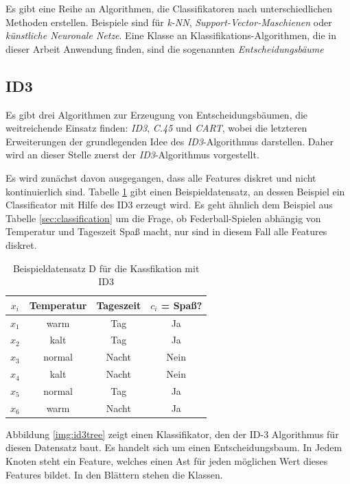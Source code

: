 Es gibt eine Reihe an Algorithmen, die Classifikatoren nach unterschiedlichen Methoden erstellen. Beispiele sind für \emph{k-NN}, \emph{Support-Vector-Maschienen} oder \emph{künstliche Neuronale Netze}. Eine Klasse an Klassifikations-Algorithmen, die in dieser Arbeit Anwendung finden, sind die sogenannten \emph{Entscheidungsbäume}

\subsection{ID3}
\label{sec:id3}

Es gibt drei Algorithmen zur Erzeugung von Entscheidungsbäumen, die weitreichende Einsatz finden: \emph{ID3}, \emph{C.45} und \emph{CART}, wobei die letzteren Erweiterungen der grundlegenden Idee des \emph{ID3}-Algorithmus darstellen. Daher wird an dieser Stelle zuerst der \emph{ID3}-Algorithmus vorgestellt. 

Es wird zunächst davon ausgegangen, dass alle Features diskret und nicht kontinuierlich sind. Tabelle \ref{tab:id3_example} gibt einen Beispieldatensatz, an dessen Beispiel ein Classificator mit Hilfe des ID3 erzeugt wird. Es geht ähnlich dem Beispiel aus Tabelle \ref{sec:classification} um die Frage, ob Federball-Spielen abhängig von Temperatur und Tageszeit Spaß macht, nur sind in diesem Fall alle Features diskret. 

\begin{table}[h]
	\centering
	\caption{Beispieldatensatz D für die Kassfikation mit ID3}
	\label{tab:id3_example}
	\begin{tabular}{cccc}
		\toprule
		$x_i$    &Temperatur   & Tageszeit & $c_i$ = Spaß? \\\midrule
		$x_1$  & warm                & Tag          & Ja           \\
		$x_2$  & kalt                & Tag          & Ja           \\
		$x_3$  & normal                & Nacht          & Nein         \\
		$x_4$  & kalt                & Nacht          & Nein           \\
		$x_5$  & normal                & Tag         & Ja       \\
		$x_6$  & warm                & Nacht          & Ja       \\ \bottomrule  
	\end{tabular}
\end{table}

Abbildung \ref{img:id3tree} zeigt einen Klassifikator, den der ID-3 Algorithmus für diesen Datensatz baut. Es handelt sich um einen Entscheidungsbaum. In Jedem Knoten steht ein Feature, welches einen Ast für jeden möglichen Wert dieses Features bildet. In den Blättern stehen die Klassen.\cite[S. 134]{machine_marsland}

